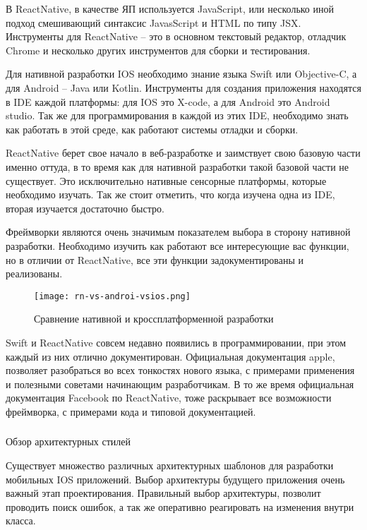 В ReactNative, в качестве ЯП используется
JavaScript, или несколько иной подход смешивающий синтаксис JavasScript и
HTML по типу JSX. Инструменты для ReactNative – это в основном текстовый
редактор, отладчик Chrome и несколько других инструментов для сборки и
тестирования. 

Для нативной разработки IOS необходимо знание языка Swift или
Objective-C, а для Android – Java или Kotlin. Инструменты для создания
приложения находятся в IDE каждой платформы: для IOS это X-code, а для
Android это Android studio. Так же для программирования в каждой из этих IDE,
необходимо знать как работать в этой среде, как работают системы отладки и
сборки.

ReactNative берет свое начало в веб-разработке и заимствует свою
базовую части именно оттуда, в то время как для нативной разработки такой
базовой части не существует. Это исключительно нативные сенсорные
платформы, которые необходимо изучать. Так же стоит отметить, что когда
изучена одна из IDE, вторая изучается достаточно быстро.

Фреймворки являются очень значимым показателем выбора в сторону
нативной разработки. Необходимо изучить как работают все интересующие вас
функции, но в отличии от ReactNative, все эти функции задокументированы и
реализованы. 

\begin{figure}[H]
	\centering
	\texttt{[image: rn-vs-androi-vsios.png]} 
	\caption{Сравнение нативной и кроссплатформенной разработки}
	\label{fig:analysis:analogues:bsuir}
\end{figure}

Swift и ReactNative совсем недавно появились в программировании, при
этом каждый из них отлично документирован. Официальная документация
apple, позволяет разобраться во всех тонкостях нового языка, с примерами
применения и полезными советами начинающим разработчикам. В то же время 
официальная документация Facebook по ReactNative, тоже раскрывает все
возможности фреймворка, с примерами кода и типовой документацией. 

\subsubsection{} Обзор архитектурных стилей
\label{sec:analysis:literature:architecture}

Существует множество различных архитектурных шаблонов для
разработки мобильных IOS приложений. Выбор архитектуры будущего
приложения очень важный этап проектирования. Правильный выбор
архитектуры, позволит проводить поиск ошибок, а так же оперативно
реагировать на изменения внутри класса. 

